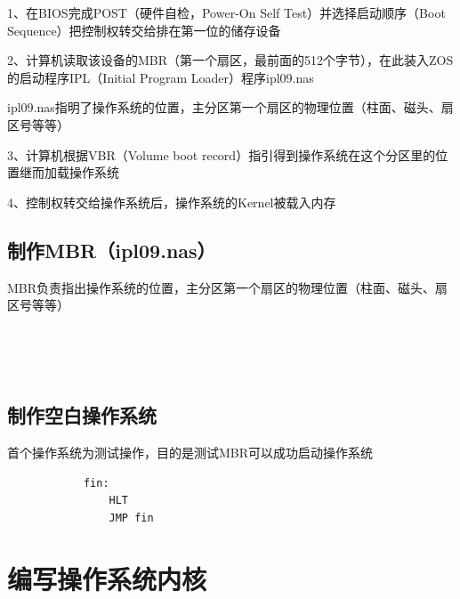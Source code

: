 \documentclass{swfcthesis}
\begin{document}
		1、在BIOS完成POST（硬件自检，Power-On Self Test）并选择启动顺序（Boot Sequence）把控制权转交给排在第一位的储存设备
		
		2、计算机读取该设备的MBR（第一个扇区，最前面的512个字节），在此装入ZOS的启动程序IPL（Initial Program Loader）程序ipl09.nas
		
		\hspace*{1cm}ipl09.nas指明了操作系统的位置，主分区第一个扇区的物理位置（柱面、磁头、扇区号等等）

		3、计算机根据VBR（Volume boot record）指引得到操作系统在这个分区里的位置继而加载操作系统
		
		4、控制权转交给操作系统后，操作系统的Kernel被载入内存
		
	\section{制作MBR（ipl09.nas）}

		MBR负责指出操作系统的位置，主分区第一个扇区的物理位置（柱面、磁头、扇区号等等）

		\begin{listing}[H]
		\inputminted[tabsize=2, firstline=6, lastline=6,
		linenos=true]{nasm}{../ZOS/src/kernel/ipl09.nas}
		\inputminted[tabsize=2, firstline=12, lastline=29,
		linenos=true]{nasm}{../ZOS/src/kernel/ipl09.nas}
		\end{listing}
		
		\inputminted[tabsize=2, firstline=43, lastline=45,
		linenos=true]{nasm}{../ZOS/src/kernel/ipl09.nas}
		
		\inputminted[tabsize=2, firstline=76, lastline=88,
		linenos=true]{nasm}{../ZOS/src/kernel/ipl09.nas}
	
	\begin{listing}[H]
		\inputminted[tabsize=2, firstline=125, lastline=147,
		linenos=true]{nasm}{../ZOS/src/kernel/ipl09.nas}
	\end{listing}

	\section{制作空白操作系统}

	首个操作系统为测试操作，目的是测试MBR可以成功启动操作系统

	\begin{verbatim}
			fin:
			    HLT
			    JMP fin
	\end{verbatim}
		
\chapter{编写操作系统内核}
\end{document}
